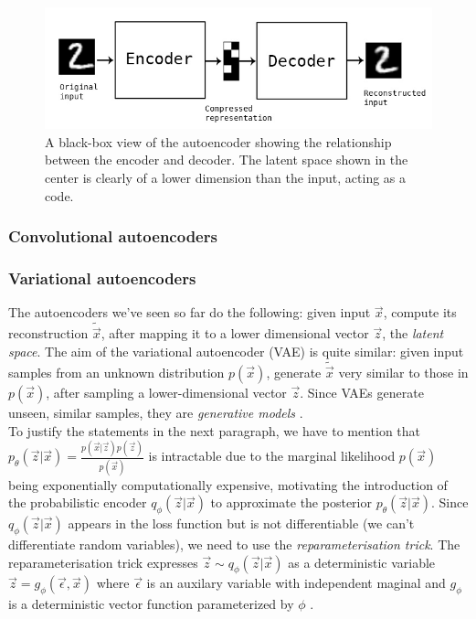 \documentclass[12pt,twoside]{article}
\begin{document}
\begin{figure}
\includegraphics[scale=2.0]{figures/autoencoder_black_box.jpg}
\centering
\captionsetup{justification=centering}
\caption{A black-box view of the autoencoder showing the relationship between the encoder and decoder. The latent space shown in the center is clearly of a lower dimension than the input, acting as a code. \cite{Chollet2016}}
\label{fig:autoencoder_black_box}
\end{figure}

\subsubsection{Convolutional autoencoders}

\subsubsection{Variational autoencoders}

The autoencoders we've seen so far do the following: given input $\vec{x}$, compute its reconstruction $\widetilde{\vec{x}}$, after mapping it to a lower dimensional vector $\vec{z}$, the \textit{latent space}. The aim of the variational autoencoder (VAE) is quite similar: given input samples from an unknown distribution $p(\vec{x})$, generate $\widetilde{\vec{x}}$ very similar to those in $p(\vec{x})$, after sampling a lower-dimensional vector $\vec{z}$. Since VAEs generate unseen, similar samples, they are \textit{generative models} \cite{Doersch2016}.\\

To justify the statements in the next paragraph, we have to mention that $p_{\theta}(\vec{z}|\vec{x})=\frac{p(\vec{x}|\vec{z})p(\vec{z})}{p(\vec{x})}$ is intractable due to the marginal likelihood $p(\vec{x})$ being exponentially computationally expensive, motivating the introduction of the probabilistic encoder $q_{\phi}(\vec{z}|\vec{x})$ to approximate the posterior $p_{\theta}(\vec{z}|\vec{x})$. Since $q_{\phi}(\vec{z}|\vec{x})$ appears in the loss function but is not differentiable (we can't differentiate random variables), we need to use the \textit{reparameterisation trick}. The reparameterisation trick expresses $\vec{z}\sim q_{\phi}(\vec{z}|\vec{x})$ as a deterministic variable $\vec{z}=g_{\phi}(\vec{\epsilon},\vec{x})$ where $\vec{\epsilon}$ is an auxilary variable with independent maginal and $g_{\phi}$ is a deterministic vector function parameterized by $\phi$ \cite{Kingma2014}.\\
\end{document}
